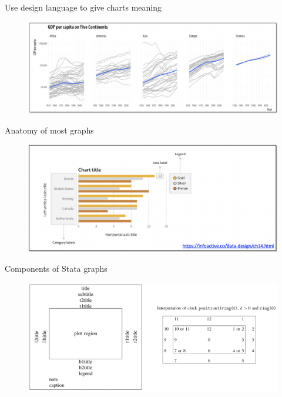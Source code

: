 \documentclass[aspectratio=169]{beamer}
\begin{document}
\begin{frame}{Use design language to give charts meaning}
	
	\begin{figure}
		\centering
		\includegraphics[width=\linewidth]{img/Charts}
	\end{figure}
	
\end{frame}


\begin{frame}{Anatomy of most graphs}
	
	\begin{figure}
		\centering
		\includegraphics[width=\linewidth]{img/Charts2}
	\end{figure}
	
\end{frame}


\begin{frame}{Components of Stata graphs}
	
	\begin{figure}
		\centering
		\includegraphics[width=\linewidth]{img/Charts3}
	\end{figure}
	
\end{frame}
\end{document}
